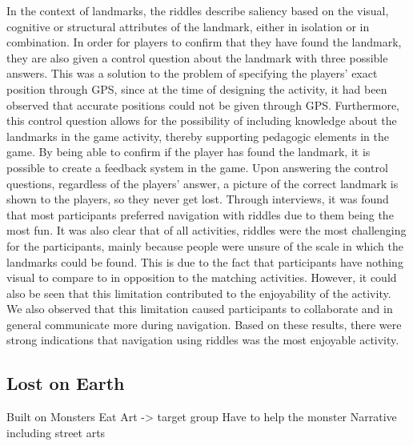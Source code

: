 In the context of landmarks, the riddles describe saliency based on the visual, cognitive or structural attributes of the landmark, either in isolation or in combination. In order for players to confirm that they have found the landmark, they are also given a control question about the landmark with three possible answers. This was a solution to the problem of specifying the players' exact position through GPS, since at the time of designing the activity, it had been observed that accurate positions could not be given through GPS. Furthermore, this control question allows for the possibility of including knowledge about the landmarks in the game activity, thereby supporting pedagogic elements in the game. By being able to confirm if the player has found the landmark, it is possible to create a feedback system in the game. Upon answering the control questions, regardless of the players' answer, a picture of the correct landmark is shown to the players, so they never get lost. Through interviews, it was found that most participants preferred navigation with riddles due to them being the most fun. It was also clear that of all activities, riddles were the most challenging for the participants, mainly because people were unsure of the scale in which the landmarks could be found. This is due to the fact that participants have nothing visual to compare to in opposition to the matching activities. However, it could also be seen that this limitation contributed to the enjoyability of the activity. We also observed that this limitation caused participants to collaborate and in general communicate more during navigation. Based on these results, there were strong indications that navigation using riddles was the most enjoyable activity.

\subsection{Lost on Earth}
Built on Monsters Eat Art -> target group
Have to help the monster
Narrative including street arts
